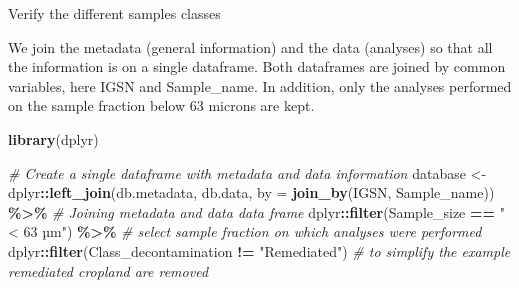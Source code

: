 \documentclass[
]{article}
\newenvironment{Shaded}{\begin{snugshade}}{\end{snugshade}}
\newcommand{\AttributeTok}[1]{\textcolor[rgb]{0.13,0.29,0.53}{#1}}
\newcommand{\CommentTok}[1]{\textcolor[rgb]{0.56,0.35,0.01}{\textit{#1}}}
\newcommand{\FunctionTok}[1]{\textcolor[rgb]{0.13,0.29,0.53}{\textbf{#1}}}
\newcommand{\NormalTok}[1]{#1}
\newcommand{\OtherTok}[1]{\textcolor[rgb]{0.56,0.35,0.01}{#1}}
\newcommand{\SpecialCharTok}[1]{\textcolor[rgb]{0.81,0.36,0.00}{\textbf{#1}}}
\newcommand{\StringTok}[1]{\textcolor[rgb]{0.31,0.60,0.02}{#1}}
\begin{document}
Verify the different samples classes

\begin{Shaded}
\end{Shaded}

We join the metadata (general information) and the data (analyses) so
that all the information is on a single dataframe. Both dataframes are
joined by common variables, here IGSN and Sample\_name. In addition,
only the analyses performed on the sample fraction below 63 microns are
kept.

\begin{Shaded}
\begin{Highlighting}[]
\FunctionTok{library}\NormalTok{(dplyr)}

\CommentTok{\# Create a single dataframe with metadata and data information}
\NormalTok{database }\OtherTok{\textless{}{-}}\NormalTok{ dplyr}\SpecialCharTok{::}\FunctionTok{left\_join}\NormalTok{(db.metadata, db.data, }\AttributeTok{by =} \FunctionTok{join\_by}\NormalTok{(IGSN, Sample\_name)) }\SpecialCharTok{\%\textgreater{}\%} \CommentTok{\# Joining metadata and data data frame}
\NormalTok{  dplyr}\SpecialCharTok{::}\FunctionTok{filter}\NormalTok{(Sample\_size }\SpecialCharTok{==} \StringTok{"\textless{} 63 µm"}\NormalTok{) }\SpecialCharTok{\%\textgreater{}\%} \CommentTok{\# select sample fraction on which analyses were performed}
\NormalTok{  dplyr}\SpecialCharTok{::}\FunctionTok{filter}\NormalTok{(Class\_decontamination }\SpecialCharTok{!=} \StringTok{"Remediated"}\NormalTok{) }\CommentTok{\# to simplify the example remediated cropland are removed}
\end{Highlighting}
\end{Shaded}

\begin{Shaded}
\end{Shaded}
\end{document}
